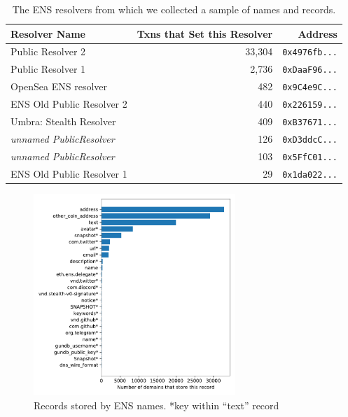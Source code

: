 \begin{table}
	\begin{tabular}{lrr}
		\toprule
		Resolver Name & Txns that Set this Resolver & Address \\
		\midrule 
		Public Resolver 2 & 33,304 & \texttt{0x4976fb...} \\
		Public Resolver 1 & 2,736 & \texttt{0xDaaF96...} \\
		OpenSea ENS resolver & 482 & \texttt{0x9C4e9C...} \\
		ENS Old Public Resolver 2 & 440	& \texttt{0x226159...} \\
		Umbra: Stealth Resolver & 409 & \texttt{0xB37671...} \\
		\textit{unnamed PublicResolver} & 126 & \texttt{0xD3ddcC...} \\
		\textit{unnamed PublicResolver} & 103 & \texttt{0x5FfC01...} \\
		ENS Old Public Resolver 1 & 29 & \texttt{0x1da022...} \\
		\bottomrule
	\end{tabular}
	\label{tab:ens_resolvers}
	\caption{The ENS resolvers from which we collected a sample of names and 
		records.}
\end{table}

\begin{figure}[t]
	\centering
	\includegraphics[width=3in]{figs/ens_names.pdf}
	\caption{Records stored by ENS names. *key within ``text'' record}
	\label{fig:ens_records}
\end{figure}

